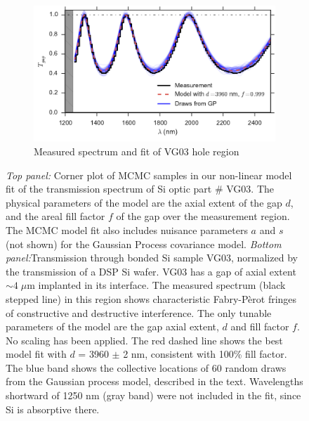 \documentclass[osajnl,preprint,showpacs,superscriptaddress,12pt]{revtex4-1} %
\begin{document}
\begin{figure}[htbp]
        \begin{subfigure}[b]{0.5\textwidth}
                \includegraphics[width=\textwidth]{figs/VG03_f100.pdf}
                \caption{Measured spectrum and fit of VG03 hole region}
                \label{figVG03_f100}
        \end{subfigure}
\caption{ \emph{Top panel:} Corner plot of MCMC samples in our non-linear model fit of the transmission spectrum of Si optic part \# VG03.  The physical parameters of the model are the axial extent of the gap $d$, and the areal fill factor $f$ of the gap over the measurement region.  The MCMC model fit also includes nuisance parameters $a$ and $s$ (not shown) for the Gaussian Process covariance model.  \emph{Bottom panel:}Transmission through bonded Si sample VG03, normalized by the transmission of a DSP Si wafer. VG03 has a gap of axial extent $\sim4\;\mu$m implanted in its interface.  The measured spectrum (black stepped line) in this region shows characteristic Fabry-P\`erot fringes of constructive and destructive interference.  The only tunable parameters of the model are the gap axial extent, $d$ and fill factor $f$.  No scaling has been applied.  The red dashed line shows the best model fit with $d$ = 3960 $\pm$ 2 nm, consistent with 100\% fill factor.  The blue band shows the collective locations of 60 random draws from the Gaussian process model, described in the text.  Wavelengths shortward of 1250 nm (gray band) were not included in the fit, since Si is absorptive there.\label{figVG03full} }
\end{figure}
\end{document}
